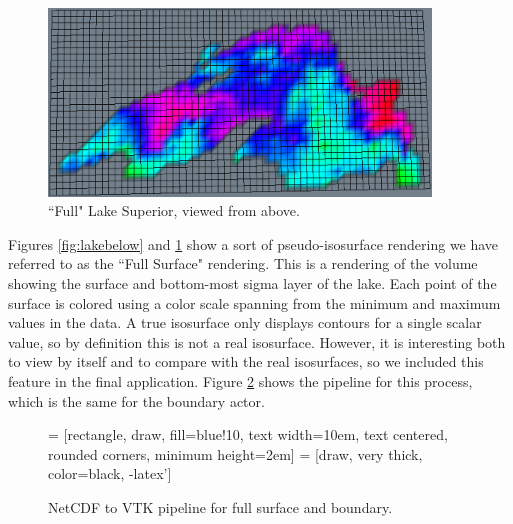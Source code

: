 \documentclass{article} %
\newcommand{\code}[1]{\texttt{#1}}
\begin{document}
\begin{figure}[htb]
   \centering
   \includegraphics[width=4in]{figures/lakeabove.eps}
   \caption{``Full" Lake Superior, viewed from above.}
   \label{fig:lakeabove}
\end{figure}

Figures \ref{fig:lakebelow} and \ref{fig:lakeabove} show a sort of pseudo-isosurface rendering we have referred to as the ``Full Surface" rendering.  This is a rendering of the volume showing the surface and bottom-most sigma layer of the lake.  Each point of the surface is colored using a color scale spanning from the minimum and maximum values in the data.  A true isosurface only displays contours for a single scalar value, so by definition this is not a real isosurface.  However, it is interesting both to view by itself and to compare with the real isosurfaces, so we included this feature in the final application.  Figure \ref{fig:flowchartFull} shows the pipeline for this process, which is the same for the boundary actor.

\begin{figure}[htb]
\centering
 = [rectangle, draw, fill=blue!10,
    text width=10em, text centered, rounded corners, minimum height=2em]
 = [draw, very thick, color=black, -latex']

\caption{NetCDF to VTK pipeline for full surface and boundary.}
\label{fig:flowchartFull}
\end{figure}
\end{document}
